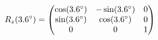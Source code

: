 \documentclass[preview]{standalone}
\begin{document}
\begin{align*}
\special{dvisvgm:raw <g id='unique000'>}R_z(3.6^\circ) = \begin{pmatrix} \cos(3.6^\circ) & -\sin(3.6^\circ) & 0 \\ \sin(3.6^\circ) & \cos(3.6^\circ) & 0 \\ 0 & 0 & 1 \end{pmatrix}\special{dvisvgm:raw </g>}
\end{align*}
\end{document}
